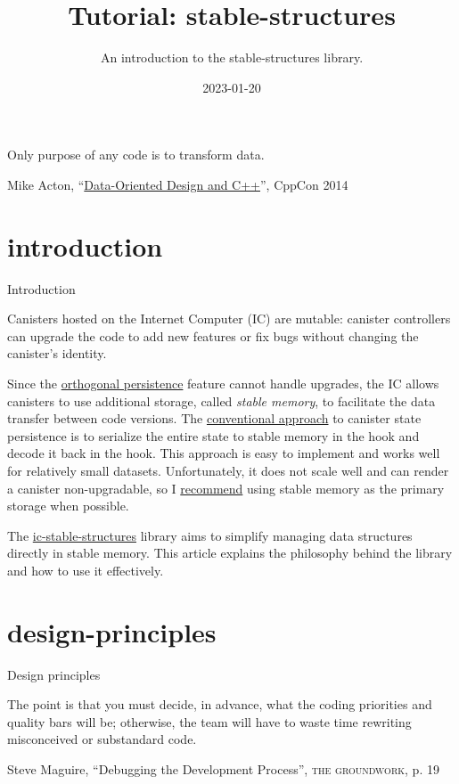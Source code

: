 \documentclass{article}
\title{Tutorial: stable-structures}
\subtitle{An introduction to the stable-structures library.}
\date{2023-01-20}
\begin{document}
\epigraph{
  Only purpose of any code is to transform data.
}{Mike Acton, ``\href{https://youtu.be/rX0ItVEVjHc?t=1360}{Data-Oriented Design and C++}'', CppCon 2014}

\section{introduction}{Introduction}

Canisters hosted on the Internet Computer (IC) are mutable: canister controllers can upgrade the code to add new features or fix bugs without changing the canister's identity.

Since the \href{/posts/06-ic-orthogonal-persistence.html#upgrades}{orthogonal persistence} feature cannot handle upgrades, the IC allows canisters to use additional storage, called \emph{stable memory}, to facilitate the data transfer between code versions.
The \href{/posts/11-ii-stable-memory.html#conventional-memory-management}{conventional approach} to canister state persistence is to serialize the entire state to stable memory in the  hook and decode it back in the  hook.
This approach is easy to implement and works well for relatively small datasets.
Unfortunately, it does not scale well and can render a canister non-upgradable, so I \href{/posts/01-effective-rust-canisters.html#stable-memory-main}{recommend} using stable memory as the primary storage when possible.


The \href{https://github.com/dfinity/stable-structures}{ic-stable-structures} library aims to simplify managing data structures directly in stable memory.
This article explains the philosophy behind the library and how to use it effectively.

\section{design-principles}{Design principles}
\epigraph{
    The point is that you must decide, in advance, what the coding priorities and quality bars will be; otherwise, the team will have to waste time rewriting misconceived or substandard code.
}{Steve Maguire, ``Debugging the Development Process'', \textsc{the groundwork}, p. 19}
\end{document}
